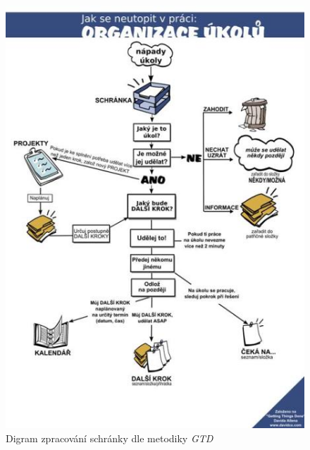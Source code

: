 \documentclass[thesis=B,czech]{FITthesis}[2012/06/26]
\newcommand{\GTD}{\textit{GTD }}
\begin{document}
\begin{figure}[h!]\centering
	\includegraphics[width=1\textwidth]{pictures/gtd_graph}
	\caption{Digram zpracování schránky dle metodiky \GTD\cite{gtd_graph}}\label{fig:gtd_graph}
\end{figure}
\end{document}
